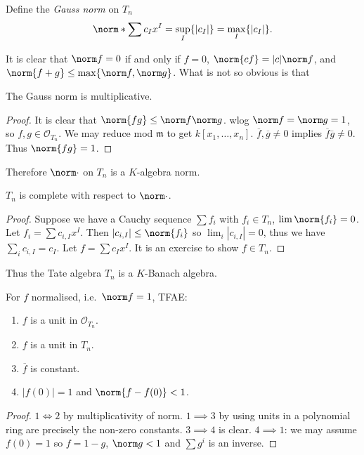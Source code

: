 \documentclass[a4paper]{article}
\begin{document}
Define the \emph{Gauss norm} on \(T_n\)
\[
  \norm*{\sum c_I x^I} = \sup_I \{|c_I|\} = \max_I \{|c_I|\}.
\]

It is clear that \(\norm f = 0\) if and only if \(f = 0\), \(\norm{cf} = |c| \norm f\), and \(\norm{f + g} \leq \max\{\norm f, \norm g\}\). What is not so obvious is that

\begin{lemma}
  The Gauss norm is multiplicative.
\end{lemma}

\begin{proof}
  It is clear that \(\norm{fg} \leq \norm f \norm g\). wlog \(\norm f = \norm g = 1\), so \(f, g \in \mathcal O_{T_n}\). We may reduce mod \(\mathfrak m\) to get \(k[x_1, \dots, x_n]\). \(\overline f, \overline g \ne 0\) implies \(\overline f \overline g \ne 0\). Thus \(\norm{fg} = 1\).
\end{proof}

Therefore \(\norm \cdot\) on \(T_n\) is a \(K\)-algebra norm.

\begin{lemma}
  \(T_n\) is complete with respect to \(\norm \cdot\).
\end{lemma}

\begin{proof}
  Suppose we have a Cauchy sequence \(\sum f_i\) with \(f_i \in T_n\), \(\lim \norm{f_i} = 0\). Let \(f_i = \sum c_{i, I} x^I\). Then \(|c_{i, I}| \leq \norm{f_i}\) so \(\lim_i |c_{i, I}| = 0\), thus we have \(\sum_i c_{i, I} = c_I\). Let \(f = \sum c_I x^I\). It is an exercise to show \(f \in T_n\).
\end{proof}

Thus the Tate algebra \(T_n\) is a \(K\)-Banach algebra.

\begin{lemma}
  \label{lem:units in Tate algebra}
  For \(f\) normalised, i.e.\ \(\norm f = 1\), TFAE:
  \begin{enumerate}
  \item \(f\) is a unit in \(\mathcal O_{T_n}\).
  \item \(f\) is a unit in \(T_n\).
  \item \(\overline f\) is constant.
  \item \(|f(0)| = 1\) and \(\norm{f - f(0)} < 1\).
  \end{enumerate}
\end{lemma}

\begin{proof}
  \(1 \iff 2\) by multiplicativity of norm. \(1 \implies 3\) by using units in a polynomial ring are precisely the non-zero constants. \(3 \implies 4\) is clear. \(4 \implies 1\): we may assume \(f(0) = 1\) so \(f = 1 - g\), \(\norm g < 1\) and \(\sum g^i\) is an inverse.
\end{proof}
\end{document}
